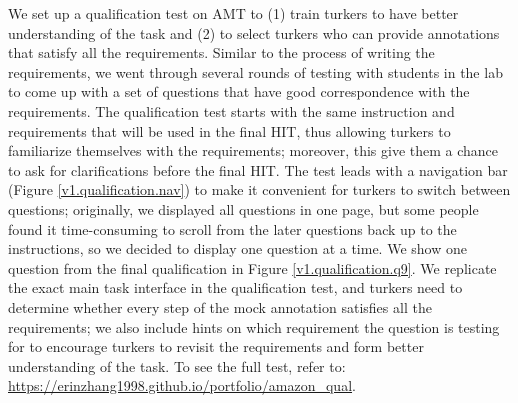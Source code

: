 We set up a qualification test on AMT to (1) train turkers to have better understanding of the task and (2) to select turkers who can provide annotations that satisfy all the requirements. Similar to the process of writing the requirements, we went through several rounds of testing with students in the lab to come up with a set of questions that have good correspondence with the requirements. The qualification test starts with the same instruction and requirements that will be used in the final HIT, thus allowing turkers to familiarize themselves with the requirements; moreover, this give them a chance to ask for clarifications before the final HIT. The test leads with a navigation bar (Figure \ref{v1.qualification.nav}) to make it convenient for turkers to switch between questions; originally, we displayed all questions in one page, but some people found it time-consuming to scroll from the later questions back up to the instructions, so we decided to display one question at a time. 
We show one question from the final qualification in Figure \ref{v1.qualification.q9}. We replicate the exact main task interface in the qualification test, and turkers need to determine whether every step of the mock annotation satisfies all the requirements; we also include hints on which requirement the question is testing for to encourage turkers to revisit the requirements and form better understanding of the task.  
To see the full test, refer to: \url{https://erinzhang1998.github.io/portfolio/amazon_qual}.

